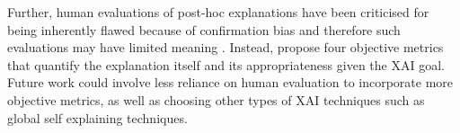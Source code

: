 \begin{enumerate}[listparindent=0.5cm]
    Further, human evaluations of post-hoc explanations have been criticised for being inherently flawed because of confirmation bias and therefore such evaluations may have limited meaning \cite{rosenfeld2021}. Instead, \cite{rosenfeld2021} propose four objective metrics that quantify the explanation itself and its appropriateness given the XAI goal. Future work could involve less reliance on human evaluation to incorporate more objective metrics, as well as choosing other types of XAI techniques such as global self explaining techniques. 

\end{enumerate}


    


